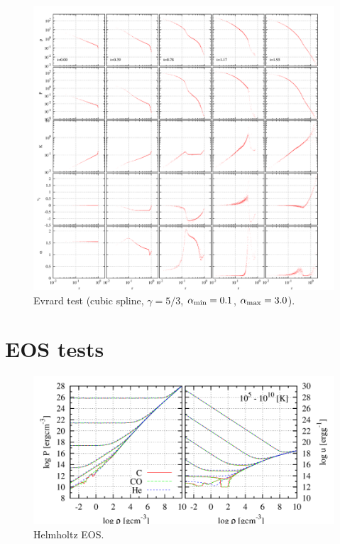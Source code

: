 \documentclass[fleqn,dvipdfmx]{article}
\begin{document}
\begin{figure}
  \begin{center}
    \includegraphics[width=14cm,bb=0 0 2120 2000]{fig/evrard/draw.png}
  \end{center}
  \caption{Evrard test (cubic spline, $\gamma=5/3$, $\alpha_{\rm
      min}=0.1$, $\alpha_{\rm max}=3.0$).}
\end{figure}

\section{EOS tests}

\begin{figure}
  \begin{center}
    \includegraphics[width=14cm,bb=0 0 980 480]{fig/eos/draw.png}
  \end{center}
  \caption{Helmholtz EOS.}
\end{figure}
\end{document}
